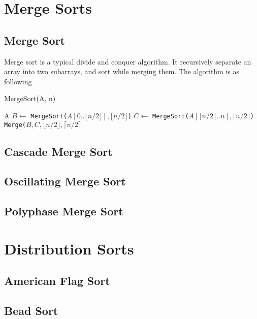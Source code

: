		\section{Merge Sorts}
			\subsection{Merge Sort}
				Merge sort is a typical divide and conquer algorithm. It recursively separate an array into two subarrays, and sort while merging them. The algorithm is as following

				\begin{algorithm}[h]
					\caption{MergeSort(A, n)}
					\begin{algorithmic}[1]
							\Return A
						\Else
							\State $B \gets$ \texttt{MergeSort($A[0 .. \lfloor n/2 \rfloor], \lfloor n/2 \rfloor$)}
							\State $C \gets$ \texttt{MergeSort($A[\lceil n/2 \rceil .. n], \lceil n/2 \rceil$)}
						\EndIf
						\Return \texttt{Merge($B, C, \lfloor n/2 \rfloor, \lceil n/2 \rceil$}
					\end{algorithmic}
				\end{algorithm}

			\subsection{Cascade Merge Sort}

			\subsection{Oscillating Merge Sort}

			\subsection{Polyphase Merge Sort}

		\section{Distribution Sorts}
			\subsection{American Flag Sort}

			\subsection{Bead Sort}

